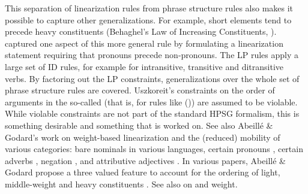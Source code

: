 \documentclass[output=paper
                ,modfonts
                ,nonflat
	        ,collection
	        ,collectionchapter
	        ,collectiontoclongg
 	        ,biblatex
                ,babelshorthands
                ,newtxmath
                ,draftmode
                ,colorlinks, citecolor=brown
]{./langsci/langscibook}
\begin{document}
This separation of linearization rules from phrase structure rules also makes it possible to capture
other generalizations. For example, short elements tend to precede heavy constituents (Behaghel's
Law of Increasing Constituents, \citealp[]{Behaghel09a}). \citet[Chapter~5]{Uszkoreit87a} captured one aspect of this more general rule by
formulating a linearization statement requiring that pronouns precede non-pronouns. The LP rules
apply a large set of ID rules, for example for intransitive, transitive and ditransitive verbs. By
factoring out the LP constraints, generalizations over the whole set of phrase structure rules are covered.
Uszkoreit's constraints on the order of arguments in the so-called \mf (that is, for rules like ()) are
assumed to be violable. While violable constraints are not part of the standard HPSG formalism, this
is something desirable and something that is worked on. See also Abeillé \& Godard's work on
weight-based linearization and the (reduced) mobility of various categories: bare nominals in
various languages, certain pronouns \citep{AG99a-u}, certain adverbs
\citep{AG2001a-u}, negation \citep{AG97a-u,AG2004a-u}, and attributive adjectives
\citep{AG99b-u}. In various papers, Abeillé \& Godard propose a three valued  feature
to account for the ordering of light, middle-weight and heavy constituents \citep{AG2000a,AG2004a-u}. See
also  on  and weight.
\end{document}
